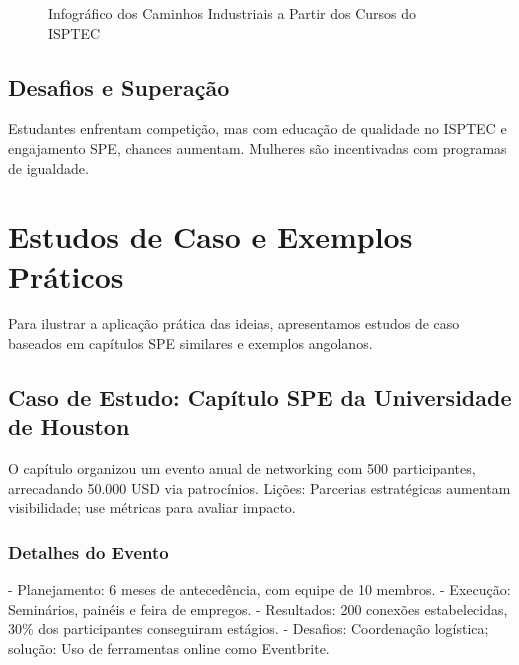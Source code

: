 \documentclass[12pt]{article}
\begin{document}
\begin{figure}[h]
{
}
\caption{Infográfico dos Caminhos Industriais a Partir dos Cursos do ISPTEC}
\end{figure}

\subsection{Desafios e Superação}
Estudantes enfrentam competição, mas com educação de qualidade no ISPTEC e engajamento SPE, chances aumentam. Mulheres são incentivadas com programas de igualdade.

\newpage

\section{Estudos de Caso e Exemplos Práticos}

Para ilustrar a aplicação prática das ideias, apresentamos estudos de caso baseados em capítulos SPE similares e exemplos angolanos.

\subsection{Caso de Estudo: Capítulo SPE da Universidade de Houston}
O capítulo organizou um evento anual de networking com 500 participantes, arrecadando 50.000 USD via patrocínios. Lições: Parcerias estratégicas aumentam visibilidade; use métricas para avaliar impacto.

\subsubsection{Detalhes do Evento}
- Planejamento: 6 meses de antecedência, com equipe de 10 membros.
- Execução: Seminários, painéis e feira de empregos.
- Resultados: 200 conexões estabelecidas, 30\% dos participantes conseguiram estágios.
- Desafios: Coordenação logística; solução: Uso de ferramentas online como Eventbrite.
\end{document}

